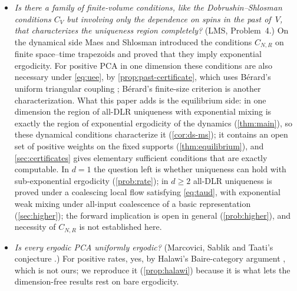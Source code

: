 \documentclass[11pt]{article}
\theoremstyle{plain}
\theoremstyle{definition}
\theoremstyle{remark}
\begin{document}
\begin{itemize}
\item \emph{Is there a family of finite-volume conditions, like the Dobrushin--Shlosman conditions $C_V$ but involving only the dependence on spins in the past of~$V$, that characterizes the uniqueness region completely?} (LMS, Problem~4.) On the dynamical side Maes and Shlosman \cite{MS91} introduced the conditions $C_{N,R}$ on finite space--time trapezoids and proved that they imply exponential ergodicity. For positive PCA in one dimension these conditions are also necessary under \eqref{eq:uee}, by \cref{prop:past-certificate}, which uses B\'erard's uniform triangular coupling \cite[Lemma~8]{Berard23}; B\'erard's finite-size criterion \cite[eq.~(5)]{Berard23} is another characterization. What this paper adds is the equilibrium side: in one dimension the region of all-DLR uniqueness with exponential mixing is exactly the region of exponential ergodicity of the dynamics (\cref{thm:main}), so these dynamical conditions characterize it (\cref{cor:ds-ms}); it contains an open set of positive weights on the fixed supports (\cref{thm:equilibrium}), and \cref{sec:certificates} gives elementary sufficient conditions that are exactly computable. In $d=1$ the question left is whether uniqueness can hold with sub-exponential ergodicity (\cref{prob:rate}); in $d\ge2$ all-DLR uniqueness is proved under a coalescing local flow satisfying \eqref{eq:taud}, with exponential weak mixing under all-input coalescence of a basic representation (\cref{sec:higher}); the forward implication is open in general (\cref{prob:higher}), and necessity of $C_{N,R}$ is not established here.
\item \emph{Is every ergodic PCA uniformly ergodic?} (Marcovici, Sablik and Taati's conjecture \cite[Section~2.2]{MSTaati19}.) For positive rates, yes, by Halawi's Baire-category argument \cite{Halawi22}, which is not ours; we reproduce it (\cref{prop:halawi}) because it is what lets the dimension-free results rest on bare ergodicity.
\end{itemize}
\end{document}
